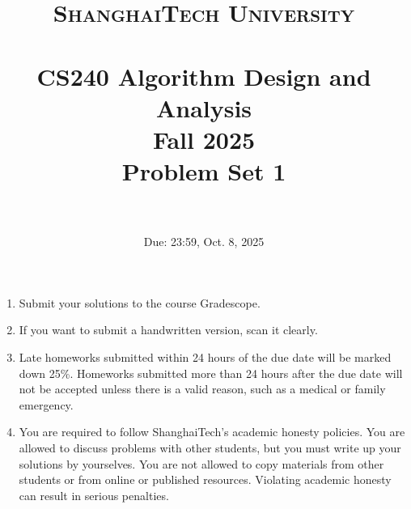 \documentclass{article}
\title{
    \normalfont \normalsize
    \textsc{ShanghaiTech University} \\ [25pt]
    \horrule{0.5pt} \\[0.4cm] %
    \huge CS240 Algorithm Design and Analysis \\ %
    \LARGE Fall 2025\\
    \LARGE Problem Set 1\\
    \horrule{2pt} \\[0.5cm] %
}
\author{}
\date{Due: 23:59, Oct. 8, 2025}
\begin{document}
\maketitle
\vspace{3ex}

\begin{enumerate}
\item Submit your solutions to the course Gradescope.
\item If you want to submit a handwritten version, scan it clearly.
\item Late homeworks submitted within 24 hours of the due date will be marked down 25\%. Homeworks submitted more than 24 hours after the due date will not be accepted unless there is a valid reason, such as a medical or family emergency.  
\item You are required to follow ShanghaiTech's academic honesty policies. You are allowed to discuss problems with other students, but you must write up your solutions by yourselves. You are not allowed to copy materials from other students or from online or published resources. Violating academic honesty can result in serious penalties.  
\end{enumerate}

\newpage


% 

% 

% 

% 

% 

% 
\end{document}
